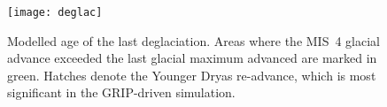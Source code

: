 \begin{figure}
  \texttt{[image: deglac]}
  \caption{Modelled age of the last deglaciation. Areas where the MIS~4 glacial
           advance exceeded the last glacial maximum advanced are marked in
           green. Hatches denote the Younger Dryas re-advance, which is most
           significant in the GRIP-driven simulation.}
  \label{fig:deglac}
\end{figure}


\endinput
